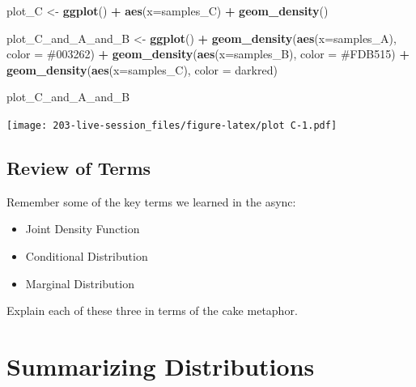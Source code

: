 \documentclass[
]{book}
\newenvironment{Shaded}{\begin{snugshade}}{\end{snugshade}}
\newcommand{\AttributeTok}[1]{\textcolor[rgb]{0.13,0.29,0.53}{#1}}
\newcommand{\FunctionTok}[1]{\textcolor[rgb]{0.13,0.29,0.53}{\textbf{#1}}}
\newcommand{\NormalTok}[1]{#1}
\newcommand{\OtherTok}[1]{\textcolor[rgb]{0.56,0.35,0.01}{#1}}
\newcommand{\SpecialCharTok}[1]{\textcolor[rgb]{0.81,0.36,0.00}{\textbf{#1}}}
\newcommand{\StringTok}[1]{\textcolor[rgb]{0.31,0.60,0.02}{#1}}
\providecommand{\tightlist}{%
  \setlength{\itemsep}{0pt}\setlength{\parskip}{0pt}}
\theoremstyle{definition}
\theoremstyle{definition}
\theoremstyle{definition}
\theoremstyle{definition}
\theoremstyle{remark}
\begin{document}
\begin{Shaded}
\begin{Highlighting}[]
\NormalTok{plot\_C }\OtherTok{\textless{}{-}} \FunctionTok{ggplot}\NormalTok{() }\SpecialCharTok{+} 
  \FunctionTok{aes}\NormalTok{(}\AttributeTok{x=}\NormalTok{samples\_C) }\SpecialCharTok{+} 
  \FunctionTok{geom\_density}\NormalTok{()}

\NormalTok{plot\_C\_and\_A\_and\_B }\OtherTok{\textless{}{-}} \FunctionTok{ggplot}\NormalTok{()   }\SpecialCharTok{+} 
  \FunctionTok{geom\_density}\NormalTok{(}\FunctionTok{aes}\NormalTok{(}\AttributeTok{x=}\NormalTok{samples\_A), }\AttributeTok{color =} \StringTok{\textquotesingle{}\#003262\textquotesingle{}}\NormalTok{) }\SpecialCharTok{+} 
  \FunctionTok{geom\_density}\NormalTok{(}\FunctionTok{aes}\NormalTok{(}\AttributeTok{x=}\NormalTok{samples\_B), }\AttributeTok{color =} \StringTok{\textquotesingle{}\#FDB515\textquotesingle{}}\NormalTok{) }\SpecialCharTok{+} 
  \FunctionTok{geom\_density}\NormalTok{(}\FunctionTok{aes}\NormalTok{(}\AttributeTok{x=}\NormalTok{samples\_C), }\AttributeTok{color =} \StringTok{\textquotesingle{}darkred\textquotesingle{}}\NormalTok{)}

\NormalTok{plot\_C\_and\_A\_and\_B}
\end{Highlighting}
\end{Shaded}

\texttt{[image: 203-live-session\_files/figure-latex/plot C-1.pdf]}

\hypertarget{review-of-terms}{%
\section{Review of Terms}\label{review-of-terms}}

Remember some of the key terms we learned in the async:

\begin{itemize}
\tightlist
\item
  Joint Density Function
\item
  Conditional Distribution
\item
  Marginal Distribution
\end{itemize}

Explain each of these three in terms of the cake metaphor.

\hypertarget{summarizing-distributions}{%
\chapter{Summarizing Distributions}\label{summarizing-distributions}}
\end{document}

